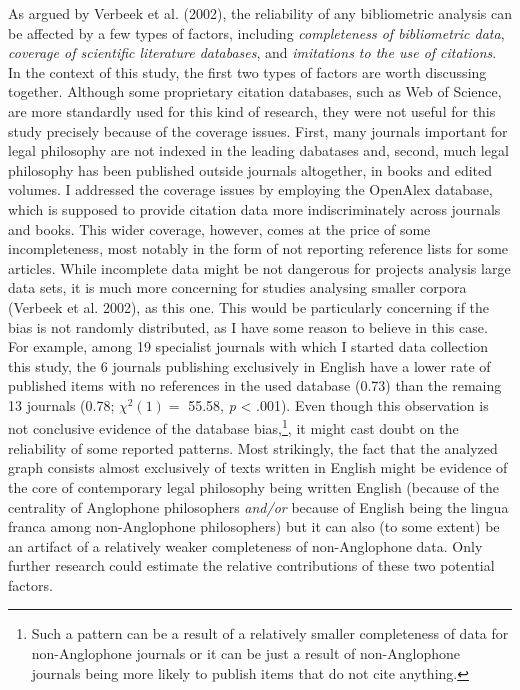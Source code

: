 \documentclass[
]{article}
\begin{document}
As argued by Verbeek et al. (2002), the reliability of any bibliometric analysis can be affected by a few types of factors, including \emph{completeness of bibliometric data}, \emph{coverage of scientific literature databases}, and \emph{imitations to the use of citations}. In the context of this study, the first two types of factors are worth discussing together. Although some proprietary citation databases, such as Web of Science, are more standardly used for this kind of research, they were not useful for this study precisely because of the coverage issues. First, many journals important for legal philosophy are not indexed in the leading dabatases and, second, much legal philosophy has been published outside journals altogether, in books and edited volumes. I addressed the coverage issues by employing the OpenAlex database, which is supposed to provide citation data more indiscriminately across journals and books. This wider coverage, however, comes at the price of some incompleteness, most notably in the form of not reporting reference lists for some articles. While incomplete data might be not dangerous for projects analysis large data sets, it is much more concerning for studies analysing smaller corpora (Verbeek et al. 2002), as this one. This would be particularly concerning if the bias is not randomly distributed, as I have some reason to believe in this case. For example, among 19 specialist journals with which I started data collection this study, the 6 journals publishing exclusively in English have a lower rate of published items with no references in the used database (0.73) than the remaing 13 journals (0.78; \(\chi^2(1) =\) 55.58, \emph{p} \textless{} .001). Even though this observation is not conclusive evidence of the database bias,\footnote{Such a pattern can be a result of a relatively smaller completeness of data for non-Anglophone journals or it can be just a result of non-Anglophone journals being more likely to publish items that do not cite anything.}, it might cast doubt on the reliability of some reported patterns. Most strikingly, the fact that the analyzed graph consists almost exclusively of texts written in English might be evidence of the core of contemporary legal philosophy being written English (because of the centrality of Anglophone philosophers \emph{and/or} because of English being the lingua franca among non-Anglophone philosophers) but it can also (to some extent) be an artifact of a relatively weaker completeness of non-Anglophone data. Only further research could estimate the relative contributions of these two potential factors.
\end{document}
